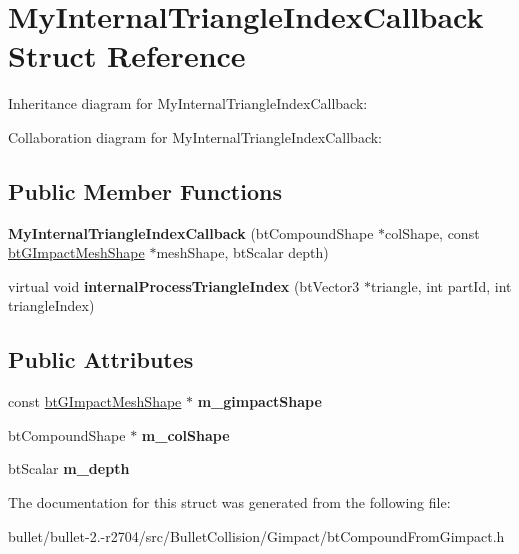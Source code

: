 \hypertarget{struct_my_internal_triangle_index_callback}{\section{My\+Internal\+Triangle\+Index\+Callback Struct Reference}
\label{struct_my_internal_triangle_index_callback}
}


Inheritance diagram for My\+Internal\+Triangle\+Index\+Callback\+:


Collaboration diagram for My\+Internal\+Triangle\+Index\+Callback\+:
\subsection*{Public Member Functions}
\begin{DoxyCompactItemize}
\item 
\hypertarget{struct_my_internal_triangle_index_callback_a3b78054be7d170dbd42341627f603602}{{\bfseries My\+Internal\+Triangle\+Index\+Callback} (bt\+Compound\+Shape $\ast$col\+Shape, const \hyperlink{classbt_g_impact_mesh_shape}{bt\+G\+Impact\+Mesh\+Shape} $\ast$mesh\+Shape, bt\+Scalar depth)}\label{struct_my_internal_triangle_index_callback_a3b78054be7d170dbd42341627f603602}

\item 
\hypertarget{struct_my_internal_triangle_index_callback_a744a56475bf2d5132d1f733c1f3a70e5}{virtual void {\bfseries internal\+Process\+Triangle\+Index} (bt\+Vector3 $\ast$triangle, int part\+Id, int triangle\+Index)}\label{struct_my_internal_triangle_index_callback_a744a56475bf2d5132d1f733c1f3a70e5}

\end{DoxyCompactItemize}
\subsection*{Public Attributes}
\begin{DoxyCompactItemize}
\item 
\hypertarget{struct_my_internal_triangle_index_callback_a0d2d1bfcbc4573105f345e67f5f43d6a}{const \hyperlink{classbt_g_impact_mesh_shape}{bt\+G\+Impact\+Mesh\+Shape} $\ast$ {\bfseries m\+\_\+gimpact\+Shape}}\label{struct_my_internal_triangle_index_callback_a0d2d1bfcbc4573105f345e67f5f43d6a}

\item 
\hypertarget{struct_my_internal_triangle_index_callback_aa51b4a19c7dd751d76857df7b4a974c2}{bt\+Compound\+Shape $\ast$ {\bfseries m\+\_\+col\+Shape}}\label{struct_my_internal_triangle_index_callback_aa51b4a19c7dd751d76857df7b4a974c2}

\item 
\hypertarget{struct_my_internal_triangle_index_callback_a136aed7091600743b9442e759485ae45}{bt\+Scalar {\bfseries m\+\_\+depth}}\label{struct_my_internal_triangle_index_callback_a136aed7091600743b9442e759485ae45}

\end{DoxyCompactItemize}


The documentation for this struct was generated from the following file\+:\begin{DoxyCompactItemize}
\item 
bullet/bullet-\/2.-\/r2704/src/\+Bullet\+Collision/\+Gimpact/bt\+Compound\+From\+Gimpact.\+h\end{DoxyCompactItemize}
